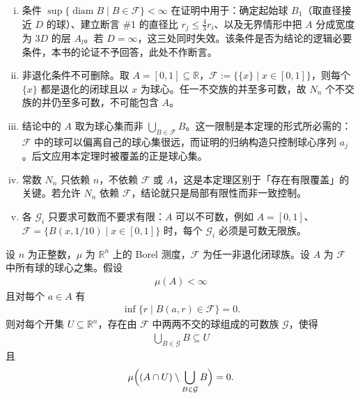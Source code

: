 \documentclass[../../main.tex]{subfiles}%
\begin{document}
\begin{remark}\label{remark:ch01-thm-1-27-条件}
\begin{enumerate}[(i)]
\item 条件 $\sup\{\operatorname{diam}B\mid B\in\mathcal{F}\}<\infty$ 在证明中用于：确定起始球 $B_1$（取直径接近 $D$ 的球）、建立断言 \#1 的直径比 $r_j\leqslant\frac{4}{3}r_i$、以及无界情形中把 $A$ 分成宽度为 $3D$ 的层 $A_l$。若 $D=\infty$，这三处同时失效。该条件是否为结论的逻辑必要条件，本书的论证不予回答，此处不作断言。
\item 非退化条件不可删除。取 $A=[0,1]\subseteq\mathbb{R}$，$\mathcal{F}:=\{\{x\}\mid x\in[0,1]\}$，则每个 $\{x\}$ 都是退化的闭球且以 $x$ 为球心。任一不交族的并至多可数，故 $N_n$ 个不交族的并仍至多可数，不可能包含 $A$。
\item 结论中的 $A$ 取为球心集而非 $\bigcup_{B\in\mathcal{F}}B$。这一限制是本定理的形式所必需的：$\mathcal{F}$ 中的球可以偏离自己的球心集很远，而证明的归纳构造只控制球心序列 $a_j$。后文应用本定理时被覆盖的正是球心集。
\item 常数 $N_n$ 只依赖 $n$，不依赖 $\mathcal{F}$ 或 $A$，这是本定理区别于「存在有限覆盖」的关键。若允许 $N_n$ 依赖 $\mathcal{F}$，结论就只是局部有限性而非一致控制。
\item 各 $\mathcal{G}_i$ 只要求可数而不要求有限：$A$ 可以不可数，例如 $A=[0,1]$、$\mathcal{F}=\{B(x,1/10)\mid x\in[0,1]\}$ 时，每个 $\mathcal{G}_i$ 必须是可数无限族。
\end{enumerate}
\end{remark}

\begin{theorem}[关于用球填充开集的进一步结论]\label{theorem:ch01-1-28}
设 $n$ 为正整数，$\mu$ 为 $\mathbb{R}^n$ 上的 Borel 测度，$\mathcal{F}$ 为任一非退化闭球族。设 $A$ 为 $\mathcal{F}$ 中所有球的球心之集。假设
\begin{align*}
\mu(A)<\infty
\end{align*}
且对每个 $a\in A$ 有
\begin{align*}
\inf\{r\mid B(a,r)\in\mathcal{F}\}=0 .
\end{align*}
则对每个开集 $U\subseteq\mathbb{R}^n$，存在由 $\mathcal{F}$ 中两两不交的球组成的可数族 $\mathcal{G}$，使得
\begin{align*}
\bigcup_{B\in\mathcal{G}}B\subseteq U
\end{align*}
且
\begin{align*}
\mu\Bigl((A\cap U)\setminus\bigcup_{B\in\mathcal{G}}B\Bigr)=0 .
\end{align*}
\end{theorem}
\end{document}
